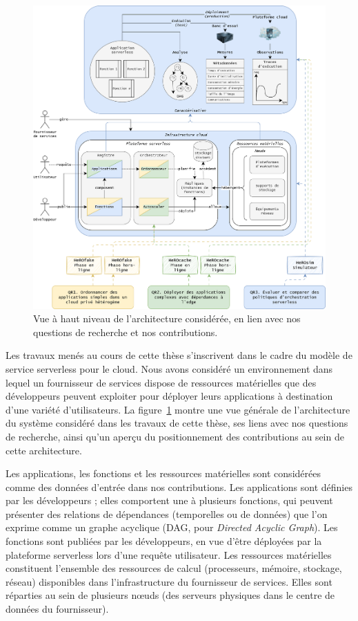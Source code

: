 \begin{figure}[!ht]
    \centering
    \includegraphics[width=\textwidth]{1_Introduction/figures/architecture.png}
	\caption{Vue à haut niveau de l'architecture considérée, en lien avec nos questions de recherche et nos contributions.}
	\label{figure:intro-architecture}
\end{figure}

Les travaux menés au cours de cette thèse s'inscrivent dans le cadre du modèle de service serverless pour le cloud. Nous avons considéré un environnement dans lequel un fournisseur de services dispose de ressources matérielles que des développeurs peuvent exploiter pour déployer leurs applications à destination d'une variété d'utilisateurs. La figure~\ref{figure:intro-architecture} montre une vue générale de l'architecture du système considéré dans les travaux de cette thèse, ses liens avec nos questions de recherche, ainsi qu'un aperçu du positionnement des contributions au sein de cette architecture.

Les applications, les fonctions et les ressources matérielles sont considérées comme des données d'entrée dans nos contributions. Les applications sont définies par les développeurs ; elles comportent une à plusieurs fonctions, qui peuvent présenter des relations de dépendances (temporelles ou de données) que l'on exprime comme un graphe acyclique (\gls{DAG}, pour \textit{Directed Acyclic Graph}). Les fonctions sont publiées par les développeurs, en vue d'être déployées par la plateforme serverless lors d'une requête utilisateur. Les ressources matérielles constituent l'ensemble des ressources de calcul (processeurs, mémoire, stockage, réseau) disponibles dans l'infrastructure du fournisseur de services. Elles sont réparties au sein de plusieurs nœuds (des serveurs physiques dans le centre de données du fournisseur).

